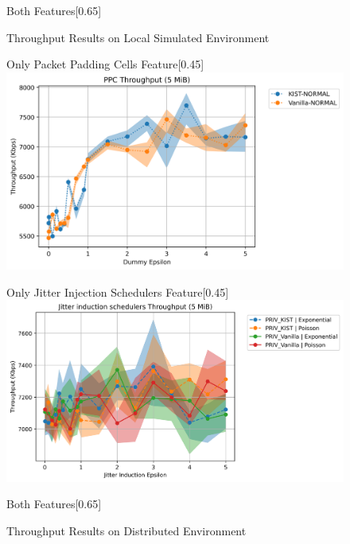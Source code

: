 \begin{figure}[htbp]
\begin{subcaptionbox}{Both Features\label{fig:local_both_throughput}}[0.65\textwidth]
    \end{subcaptionbox}
    \caption{Throughput Results on Local Simulated Environment}\label{fig:local_throughput}
\end{figure}

\begin{figure}[htbp]
    \centering
    \caption{Throughput Results on Distributed Environment}\label{fig:dist_throughput}
    \begin{subcaptionbox}{Only Packet Padding Cells Feature\label{fig:dist_ppc_throughput}}[0.45\textwidth]
        {\includegraphics[width=\linewidth]{Chapters/Figures/Plots/dist_throughput_50_PPC_5mib.png}}
    \end{subcaptionbox}
    \hfill
    \begin{subcaptionbox}{Only Jitter Injection Schedulers Feature\label{fig:dist_jitter_throughput}}[0.45\textwidth]
        {\includegraphics[width=\linewidth]{Chapters/Figures/Plots/dist_throughput_50_jitter_5mib.png}}
    \end{subcaptionbox}
    \vfill
    \begin{subcaptionbox}{Both Features\label{fig:dist_both_throughput}}[0.65\textwidth]

\end{subcaptionbox}
\end{figure}
